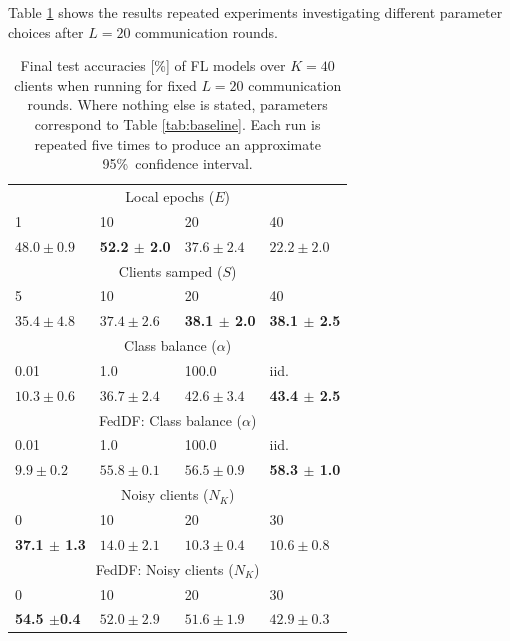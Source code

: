 \documentclass{article}
\begin{document}
Table \ref{tab:main} shows the results repeated experiments investigating different parameter choices after $L=20$ communication rounds.
\begin{table}[htb!]
    \centering
    \begin{tabular}{llll}
       \hline
        \multicolumn{4}{c}{Local epochs ($E$)}\\
        1 & 10 & 20 & 40 \\
       \hline
$48.0 \pm 0.9$ & \textbf{ 52.2 $\pm$ 2.0 } & $37.6 \pm 2.4$ & $22.2 \pm 2.0$ \\
        \multicolumn{4}{c}{Clients samped ($S$)}\\
        5 & 10 & 20 & 40 \\
       \hline
        $35.4 \pm 4.8$ & $37.4 \pm 2.6$ & \textbf{ 38.1 $\pm$ 2.0 } & \textbf{ 38.1 $\pm$ 2.5 } \\
        \multicolumn{4}{c}{Class balance ($\alpha$)}\\
        0.01 & 1.0 & 100.0 & iid. \\
       \hline
        $10.3 \pm 0.6$ & $36.7 \pm 2.4$ & $42.6 \pm 3.4$ & \textbf{ 43.4 $\pm$ 2.5  }\\
        \multicolumn{4}{c}{FedDF: Class balance ($\alpha$)}\\
        0.01 & 1.0 & 100.0 & iid. \\
       \hline
        $9.9 \pm 0.2$ & $55.8 \pm 0.1$ & $56.5 \pm 0.9$ & \textbf{ 58.3 $\pm$ 1.0 } \\
        \multicolumn{4}{c}{Noisy clients ($N_K$)}\\
        0 & 10 & 20 & 30 \\
       \hline
        \textbf{ 37.1 $\pm$ 1.3 } & $14.0 \pm 2.1$ & $10.3 \pm 0.4$ & $10.6 \pm 0.8$ \\
        \multicolumn{4}{c}{FedDF: Noisy clients ($N_K$)}\\
        0 & 10 & 20 & 30 \\
       \hline
        \textbf{ 54.5 $\pm $0.4 } & $52.0 \pm 2.9$ & $51.6 \pm 1.9$ & $42.9 \pm 0.3$ \\
\end{tabular}
    \caption{
    Final test accuracies [\%] of FL models over $K=40$ clients when running for fixed $L=20$ communication rounds.
    Where nothing else is stated, parameters correspond to Table \ref{tab:baseline}.
    Each run is repeated five times to produce an approximate 95\%\ confidence interval.
    }
    \label{tab:main}
\end{table}
\end{document}
